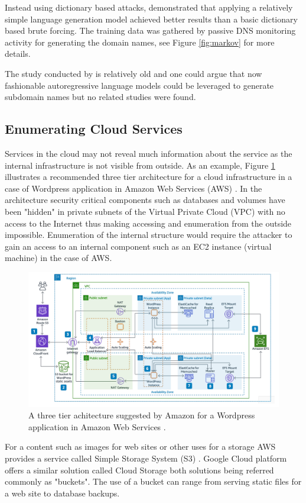 Instead using dictionary based attacks, \citet{SMART_BRUTE} demonstrated that applying a relatively simple language generation model achieved better results than a basic dictionary based brute forcing. The training data was gathered by passive DNS monitoring activity for generating the domain names, see Figure \ref{fig:markov} for more details.


The study conducted by \citet{SMART_BRUTE} is relatively old and one could argue that now fashionable autoregressive language models could be leveraged to generate subdomain names but no related studies were found.


\subsection{Enumerating Cloud Services}
\label{sec:cloud}

Services in the cloud may not reveal much information about the service as the internal infrastructure is not visible from outside. As an example, Figure \ref{fig:cloud_structure} illustrates a recommended three tier architecture for a cloud infrastructure in a case of Wordpress application in Amazon Web Services (AWS) \cite{AWSbestpractices}. In the architecture security critical components such as databases and volumes have been "hidden" in private subnets of the Virtual Private Cloud (VPC) with no access to the Internet thus making accessing and enumeration from the outside impossible. Enumeration of the internal structure would require the attacker to gain an access to an internal component such as an EC2 instance (virtual machine) in the case of AWS.

\begin{figure}[htb]
  \begin{center}
    \includegraphics[width=1.0\textwidth]{cloud_rakenne.png}
    \caption{A three tier achitecture suggested by Amazon for a Wordpress application in Amazon Web Services \cite{AWSbestpractices}.} 
    \label{fig:cloud_structure}
  \end{center}
\end{figure}
For a content such as images for web sites or other uses for a storage AWS provides a service called Simple Storage System (S3) \cite{s3buckets}. Google Cloud platform offers a similar solution called Cloud Storage \cite{googlebuckets} both solutions being referred commonly as "buckets". The use of a bucket can range from serving static files for a web site to database backups.

